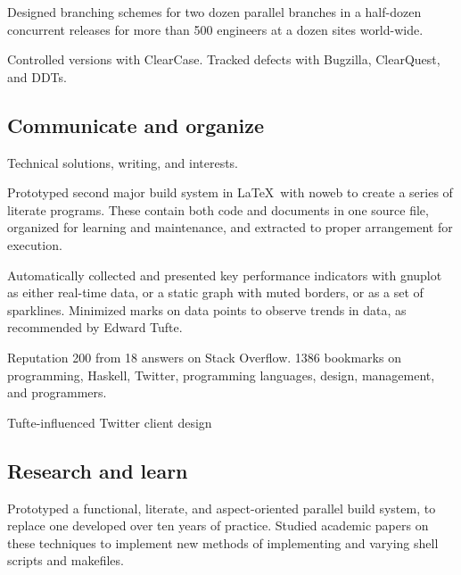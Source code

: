 \documentclass{tufte-handout}
\begin{document}
Designed branching schemes for two dozen parallel branches in a
half-dozen concurrent releases for more than 500 engineers at a dozen
sites world-wide.

Controlled versions with ClearCase.  Tracked defects with Bugzilla,
ClearQuest, and DDTs.


\subsection{Communicate and organize}

Technical
solutions, writing, and interests.

Prototyped second major build system in \LaTeX\ with noweb to create a
series of literate programs.  These contain both code and documents in
one source file, organized for learning and maintenance, and extracted
to proper arrangement for execution.

Automatically collected and presented key performance indicators with
gnuplot as either real-time data, or a static graph with muted borders,
or as a set of sparklines.  Minimized marks on data points to observe
trends in data, as recommended by Edward Tufte.


Reputation
200 from 18 answers on Stack Overflow.
1386 bookmarks on
programming, Haskell, Twitter, programming languages, design,
management, and programmers.

Tufte-influenced Twitter client design


\subsection{Research and learn}

Prototyped a functional, literate, and aspect-oriented parallel build
system, to replace one developed over ten years of practice.
Studied academic papers on these techniques to implement new
methods of implementing and varying shell scripts and makefiles.
\end{document}
